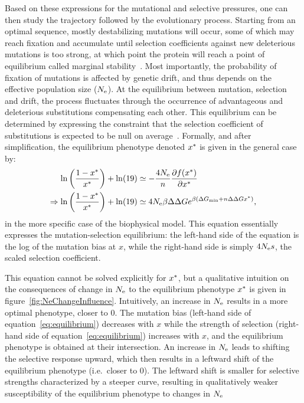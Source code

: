 Based on these expressions for the mutational and selective pressures, one can then study the trajectory followed by the evolutionary process.
Starting from an optimal sequence, mostly destabilizing mutations will occur, some of which may reach fixation and accumulate until selection coefficients against new deleterious mutations is too strong, at which point the protein will reach a point of equilibrium called marginal stability~\citep{Taverna2002, Bloom2007}.
Most importantly, the probability of fixation of mutations is affected by {genetic drift}, and thus depends on the {effective population size} ($N_{\text{e}}$).
At the equilibrium between mutation, selection and drift, the process fluctuates through the occurrence of advantageous and deleterious {substitutions} compensating each other.
This equilibrium can be determined by expressing the constraint that the selection coefficient of {substitutions} is expected to be null on average~\citep{Goldstein2013}.
Formally, and after simplification, the equilibrium {phenotype} denoted $x^{*}$ is given in the general case by:
\begin{align}
    \ln \left( \frac{1 - x\eq}{x\eq} \right) + \ln (19) & \simeq - \frac{4\Ne}{\NbrSites} \frac{ \partial \logfit (x\eq) }{\partial {x\eq}} \\
    \Rightarrow \ln \left( \frac{1 - x\eq}{x\eq} \right) + \ln (19) & \simeq 4\Ne \beta \EmpiricalDeltaDeltaG e^{\beta (\EmpiricalDeltaGmin + \NbrSites \EmpiricalDeltaDeltaG x\eq)} \text{,} \label{eq:equilibrium}
\end{align}
in the more specific case of the biophysical model.
This equation essentially expresses the mutation-selection equilibrium: the left-hand side of the equation is the log of the mutation bias at $x$, while the right-hand side is simply $4 N_{\text{e}} s$, the scaled selection coefficient.

This equation cannot be solved explicitly for $x^{*}$, but a qualitative intuition on the consequences of change in $N_{\text{e}}$ to the equilibrium {phenotype} $x^{*}$ is given in figure~\ref{fig:NeChangeInfluence}.
Intuitively, an increase in $N_{\text{e}}$ results in a more optimal {phenotype}, closer to $0$.
The mutation bias (left-hand side of equation~\ref{eq:equilibrium}) decreases with $x$ while the strength of selection (right-hand side of equation~\ref{eq:equilibrium}) increases with $x$, and the equilibrium {phenotype} is obtained at their intersection.
An increase in $N_{\text{e}}$ leads to shifting the selective response upward, which then results in a leftward shift of the equilibrium {phenotype} (i.e.~closer to $0$).
The leftward shift is smaller for selective strengths characterized by a steeper curve, resulting in qualitatively weaker susceptibility of the equilibrium {phenotype} to changes in $N_{\text{e}}$

